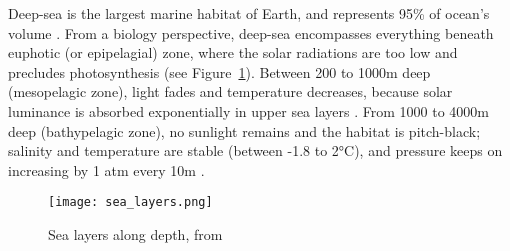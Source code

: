 




Deep-sea is the largest marine habitat of Earth, and represents 95\% of ocean's volume \citep{danovaro2017,salazar2016,webb2010}. From a biology perspective, deep-sea encompasses everything beneath euphotic (or epipelagial) zone, where the solar radiations are too low and precludes photosynthesis \citep{baker2020,danovaro2017,salazar2016} (see Figure~\ref{fig:dsl}). Between 200 to 1000m deep (mesopelagic zone), light fades and temperature decreases, because solar luminance is absorbed exponentially in upper sea layers \citep{reynolds2001}. From 1000 to 4000m deep (bathypelagic zone), no sunlight remains and the habitat is pitch-black; salinity and temperature are stable (between -1.8 to 2°C), and pressure keeps on increasing by 1 atm every 10m \citep{danovaro2017}. 

\begin{figure} [!htbp]
	\begin{center}
		\texttt{[image: sea\_layers.png]}
	\end{center}
	\caption[Petite légende]{Sea layers along depth, from \citep{fig_deep_sea}}
	\label{fig:dsl}
\end{figure}

